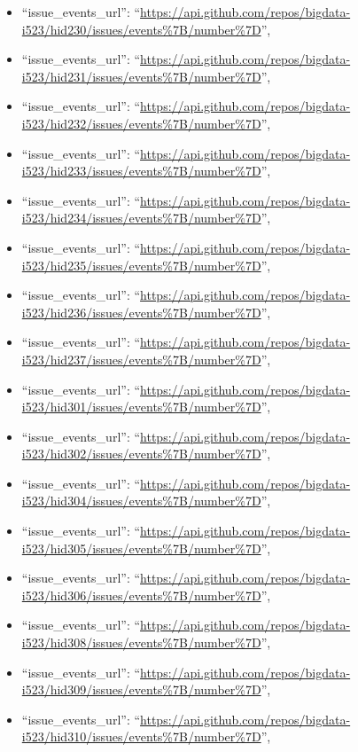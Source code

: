 \begin{itemize}
\item
  ``issue\_events\_url'':
  ``\url{https://api.github.com/repos/bigdata-i523/hid230/issues/events\%7B/number\%7D}'',
\item
  ``issue\_events\_url'':
  ``\url{https://api.github.com/repos/bigdata-i523/hid231/issues/events\%7B/number\%7D}'',
\item
  ``issue\_events\_url'':
  ``\url{https://api.github.com/repos/bigdata-i523/hid232/issues/events\%7B/number\%7D}'',
\item
  ``issue\_events\_url'':
  ``\url{https://api.github.com/repos/bigdata-i523/hid233/issues/events\%7B/number\%7D}'',
\item
  ``issue\_events\_url'':
  ``\url{https://api.github.com/repos/bigdata-i523/hid234/issues/events\%7B/number\%7D}'',
\item
  ``issue\_events\_url'':
  ``\url{https://api.github.com/repos/bigdata-i523/hid235/issues/events\%7B/number\%7D}'',
\item
  ``issue\_events\_url'':
  ``\url{https://api.github.com/repos/bigdata-i523/hid236/issues/events\%7B/number\%7D}'',
\item
  ``issue\_events\_url'':
  ``\url{https://api.github.com/repos/bigdata-i523/hid237/issues/events\%7B/number\%7D}'',
\item
  ``issue\_events\_url'':
  ``\url{https://api.github.com/repos/bigdata-i523/hid301/issues/events\%7B/number\%7D}'',
\item
  ``issue\_events\_url'':
  ``\url{https://api.github.com/repos/bigdata-i523/hid302/issues/events\%7B/number\%7D}'',
\item
  ``issue\_events\_url'':
  ``\url{https://api.github.com/repos/bigdata-i523/hid304/issues/events\%7B/number\%7D}'',
\item
  ``issue\_events\_url'':
  ``\url{https://api.github.com/repos/bigdata-i523/hid305/issues/events\%7B/number\%7D}'',
\item
  ``issue\_events\_url'':
  ``\url{https://api.github.com/repos/bigdata-i523/hid306/issues/events\%7B/number\%7D}'',
\item
  ``issue\_events\_url'':
  ``\url{https://api.github.com/repos/bigdata-i523/hid308/issues/events\%7B/number\%7D}'',
\item
  ``issue\_events\_url'':
  ``\url{https://api.github.com/repos/bigdata-i523/hid309/issues/events\%7B/number\%7D}'',
\item
  ``issue\_events\_url'':
  ``\url{https://api.github.com/repos/bigdata-i523/hid310/issues/events\%7B/number\%7D}'',

\end{itemize}
